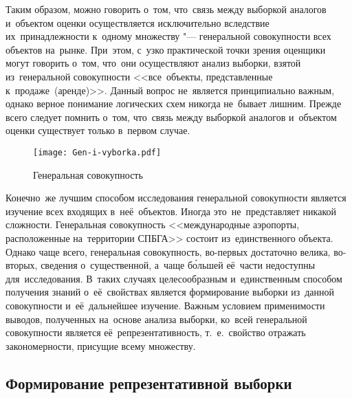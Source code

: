 \documentclass[]{scrartcl}
\begin{document}
Таким образом, можно говорить о~том, что~связь между выборкой аналогов и~объектом оценки осуществляется исключительно вследствие их~принадлежности к~одному множеству "--- генеральной совокупности всех объектов на~рынке. При~этом, с~узко практической точки зрения оценщики могут говорить о~том, что~они осуществляют анализ выборки, взятой из~генеральной совокупности <<все~объекты, представленные к~продаже~(аренде)>>. Данный вопрос не~является принципиально важным, однако верное понимание логических схем никогда не~бывает лишним. Прежде всего следует помнить о~том, что~связь между выборкой аналогов и~объектом оценки существует только в~первом случае.
 \begin{figure}[ht]
\centering %
\texttt{[image: Gen-i-vyborka.pdf]}
\caption{Генеральная совокупность}\label{fig:Gen-sovokup}
\end{figure}
\par
Конечно~же лучшим способом исследования генеральной совокупности является изучение всех входящих в~неё~объектов. Иногда это~не~представляет никакой сложности. Генеральная совокупность <<международные аэропорты, расположенные на~территории СПБГА>> состоит из~единственного объекта. Однако чаще всего, генеральная совокупность, во-первых достаточно велика, во-вторых, сведения о~существенной, а~чаще б\'ольшей её~части недоступны для~исследования. В~таких случаях целесообразным и~единственным способом получения знаний о~её~свойствах является формирование выборки из~данной совокупности и~её~дальнейшее изучение. Важным условием применимости выводов, полученных на~основе анализа выборки, ко~всей генеральной совокупности является её~репрезентативность, т.~е.~свойство отражать закономерности, присущие всему множеству.

\subsection{Формирование репрезентативной выборки}
\end{document}
